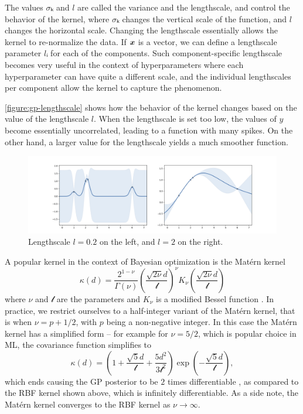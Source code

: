 The values $σₖ$ and $l$ are called the variance and the lengthscale, and control
the behavior of the kernel, where $σₖ$ changes the vertical scale of the
function, and $l$ changes the horizontal scale. Changing the lengthscale
essentially allows the kernel to re-normalize the data. If ${\boldsymbol{x}}$ is a vector, we
can define a lengthscale parameter $lᵢ$ for each of the components. Such
component-specific lengthscale becomes very useful in the context of hyperparameters where each hyperparameter
can have quite a different scale, and the individual lengthscales per component
allow the kernel to capture the phenomenon.

\autoref{figure:gp-lengthscale} shows how the behavior of the kernel
changes based on the value of the lengthscale $l$. When the lengthscale
is set too low, the values of $y$ become essentially uncorrelated, leading to a
function with many spikes. On the other hand, a larger value for the lengthscale
yields a much smoother function.

\begin{figure}
  \begin{center}
    \includegraphics[width=1.0\textwidth]{images/gp-lengthscale.png}
    \caption{Lengthscale $l = 0.2$ on the left, and $l = 2$ on the right.}
    
    \label{figure:gp-lengthscale}
  \end{center}
\end{figure}

A popular kernel in the context of Bayesian optimization is the Mat\'ern kernel
$$
\kappa(d) = \frac{2^{1 - \nu}}{\Gamma(\nu)} \left( \frac{\sqrt{2\nu}d}{\mathcal{l}} \right)^\nu K_\nu \left( \frac{\sqrt{2\nu}d}{\mathcal{l}} \right)
$$
where $\nu$ and $\mathcal{l}$ are the parameters and $K_\nu$ is a modified Bessel function \citep{williams2006gaussian}. In practice, we restrict ourselves to a half-integer variant of the Mat\'ern kernel, that is when $\nu = p + 1/2$, with $p$ being a non-negative integer. In this case the Mat\'ern kernel has a simplified form -- for example for $\nu = 5/2$, which is popular choice in ML, the covariance function simplifies to
$$
\kappa(d) = \left( 1 + \frac{\sqrt{5}d}{\mathcal{l}} + \frac{5d^2}{3\mathcal{l}^2} \right) \exp \left( - \frac{\sqrt{5}d}{\mathcal{l}} \right),
$$
which ends causing the GP posterior to be $2$ times differentiable \citep{williams2006gaussian}, as compared to the RBF kernel shown above, which is infinitely differentiable. As a side note, the Mat\'ern kernel converges to the RBF kernel as $\nu \rightarrow \infty$.

